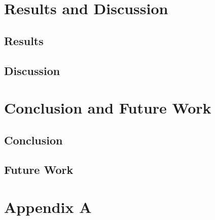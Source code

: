 \documentclass[a4paper,12pt]{report}
\begin{document}
\chapter{Results and Discussion}
\section{Results}
\section{Discussion}

\chapter{Conclusion and Future Work}
\section{Conclusion}
\section{Future Work}

\appendix
\chapter{Appendix A}
\end{document}
